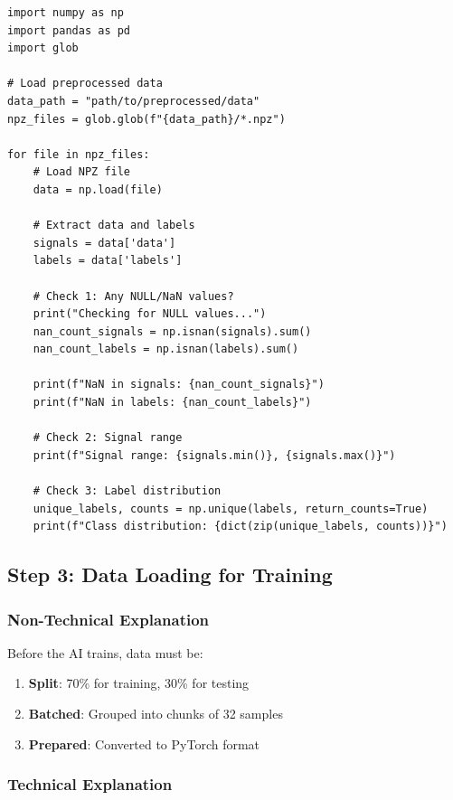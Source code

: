 \documentclass[12pt,a4paper]{article}
\begin{document}
\begin{lstlisting}[caption={Check Data After Preprocessing}]
import numpy as np
import pandas as pd
import glob

# Load preprocessed data
data_path = "path/to/preprocessed/data"
npz_files = glob.glob(f"{data_path}/*.npz")

for file in npz_files:
    # Load NPZ file
    data = np.load(file)
    
    # Extract data and labels
    signals = data['data']
    labels = data['labels']
    
    # Check 1: Any NULL/NaN values?
    print("Checking for NULL values...")
    nan_count_signals = np.isnan(signals).sum()
    nan_count_labels = np.isnan(labels).sum()
    
    print(f"NaN in signals: {nan_count_signals}")
    print(f"NaN in labels: {nan_count_labels}")
    
    # Check 2: Signal range
    print(f"Signal range: {signals.min()}, {signals.max()}")
    
    # Check 3: Label distribution
    unique_labels, counts = np.unique(labels, return_counts=True)
    print(f"Class distribution: {dict(zip(unique_labels, counts))}")
\end{lstlisting}

\subsection{Step 3: Data Loading for Training}

\subsubsection{Non-Technical Explanation}

Before the AI trains, data must be:

\begin{enumerate}
    \item \textbf{Split}: 70\% for training, 30\% for testing
    \item \textbf{Batched}: Grouped into chunks of 32 samples
    \item \textbf{Prepared}: Converted to PyTorch format
\end{enumerate}

\subsubsection{Technical Explanation}
\end{document}

